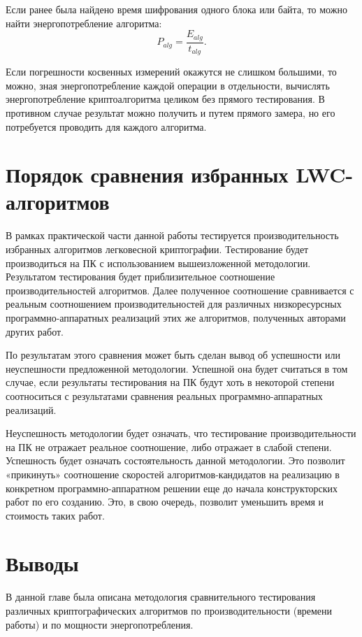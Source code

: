 Если ранее была найдено время шифрования одного блока или байта, то можно найти энергопотребление алгоритма:
\begin{equation}
P_{alg} = \frac{ E_{alg} }{ t_{alg} }.
\end{equation}

Если погрешности косвенных измерений окажутся не слишком большими, то можно, зная энергопотребление каждой операции в отдельности, вычислять энергопотребление криптоалгоритма целиком без прямого тестирования. В противном случае результат можно получить и путем прямого замера, но его потребуется проводить для каждого алгоритма.

\section{Порядок сравнения избранных LWC-алгоритмов} \label{ch3:sec4}

В рамках практической части данной работы тестируется производительность избранных алгоритмов легковесной криптографии. Тестирование будет производиться на ПК с использованием вышеизложенной методологии. Результатом тестирования будет приблизительное соотношение производительностей алгоритмов. Далее полученное соотношение сравнивается с реальным соотношением производительностей для различных низкоресурсных программно-аппаратных реализаций этих же алгоритмов, полученных авторами других работ.

По результатам этого сравнения может быть сделан вывод об успешности или неуспешности предложенной методологии. Успешной она будет считаться в том случае, если результаты тестирования на ПК будут хоть в некоторой степени соотноситься с результатами сравнения реальных программно-аппаратных реализаций.

Неуспешность методологии будет означать, что тестирование производительности на ПК не отражает реальное соотношение, либо отражает в слабой степени. Успешность будет означать состоятельность данной методологии. Это позволит «прикинуть» соотношение скоростей алгоритмов-кандидатов на реализацию в конкретном программно-аппаратном решении еще до начала конструкторских работ по его созданию. Это, в свою очередь, позволит уменьшить время и стоимость таких работ.


\section{Выводы} \label{ch3:conclusion}

В данной главе была описана методология сравнительного тестирования различных криптографических алгоритмов по производительности (времени работы) и по мощности энергопотребления.

\newpage


%
